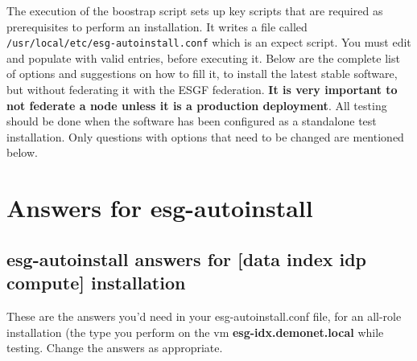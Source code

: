 The execution of the boostrap script sets up key scripts that are
  required as prerequisites to perform an installation. It writes a file
  called \texttt{/usr/local/etc/esg-autoinstall.conf} which is an expect
  script. You must edit and populate with valid entries, before
  executing it. Below are the complete list of options and suggestions
  on how to fill it, to install the latest stable software, but without
  federating it with the ESGF federation. \textbf{It is very important
  to not federate a node unless it is a production deployment}. All
  testing should be done when the software has been configured as a
  standalone test installation. Only questions with options that need to
  be changed are mentioned below.

\section{Answers for esg-autoinstall}
\subsection{esg-autoinstall answers for [data index idp compute] installation}

These are the answers you'd need in your esg-autoinstall.conf file, for an all-role installation (the type you perform on the vm \textbf{esg-idx.demonet.local} while testing.
Change the answers as appropriate.

